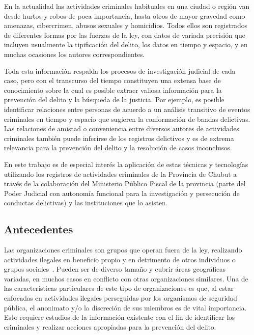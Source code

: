 
En la actualidad las actividades criminales habituales en una ciudad o región van desde hurtos y robos de poca importancia, hasta otros de mayor gravedad como amenazas, cibercrimen, abusos sexuales y  homicidios. Todos ellos son registrados de diferentes formas por las fuerzas de la ley, con datos de variada precisión que incluyen usualmente la tipificación del delito, los datos en tiempo y espacio, y en muchas ocasiones los autores correspondientes.

Toda esta información respalda los procesos de investigación judicial de cada caso, pero con el transcurso del tiempo constituyen una extensa base de conocimiento sobre la cual es posible extraer valiosa información para la prevención del delito y la búsqueda de la justicia. Por ejemplo, es posible identificar relaciones entre personas de acuerdo a un análisis transitivo de eventos criminales en tiempo y espacio que sugieren la conformación de bandas delictivas. Las relaciones de amistad o conveniencia entre diversos autores de actividades criminales también puede inferirse de los registros delictivos y es de extrema relevancia para la prevención del delito y la resolución de casos inconclusos.

En este trabajo es de especial interés la aplicación de estas técnicas y tecnologías utilizando los registros de actividades criminales de la Provincia de Chubut a través de la colaboración del Ministerio Público Fiscal de la provincia (parte del Poder Judicial con autonomía funcional para la investigación y persecución de conductas delictivas) y las instituciones que lo asisten.



\subsection{Antecedentes}
Las organizaciones criminales son grupos que operan fuera de la ley, realizando actividades ilegales en beneficio propio y en detrimento de otros individuos o grupos sociales~\cite{ref_article1}. Pueden ser de diverso tamaño y cubrir áreas geográficas variadas, en muchos casos en conflicto con otras organizaciones similares. Una de las características particulares de este tipo de organizaciones es que, al estar enfocadas en actividades ilegales perseguidas por los organismos de seguridad pública, el anonimato y/o la discreción de sus miembros es de vital importancia. Esto requiere estudios de la información existente con el fin de identificar los criminales y realizar acciones apropiadas para la prevención del delito.

